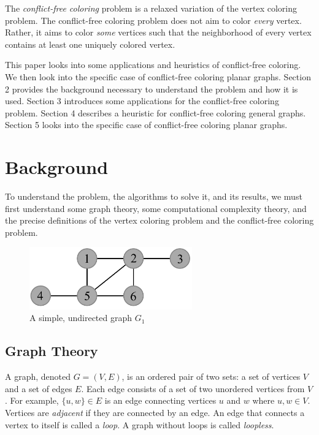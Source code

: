 \documentclass{sig-alternate}
\begin{document}
The \emph{conflict-free coloring} problem is a relaxed variation of the vertex coloring problem. The conflict-free coloring problem does not aim to color \emph{every} vertex. Rather, it aims to color \emph{some} vertices such that the neighborhood of every vertex contains at least one uniquely colored vertex.

This paper looks into some applications and heuristics of conflict-free coloring. We then look into the specific case of conflict-free coloring planar graphs. Section 2 provides the background necessary to understand the problem and how it is used. Section 3 introduces some applications for the conflict-free coloring problem. Section 4 describes a heuristic for conflict-free coloring general graphs. Section 5 looks into the specific case of conflict-free coloring planar graphs.


\section{Background}
\label{sec:background}
To understand the problem, the algorithms to solve it, and its results, we must first understand some graph theory, some computational complexity theory, and the precise definitions of the vertex coloring problem and the conflict-free coloring problem.

\begin{figure}[h]
	\centering
	\includegraphics[width=7cm]{../figures/example.pdf}
	\caption{A simple, undirected graph $G_1$}\label{fig:graph}
\end{figure}

\subsection{Graph Theory}
\label{sec:graphtheory}

A graph, denoted $G=(V,E)$, is an ordered pair of two sets: a set of vertices $V$ and a set of edges $E$. Each edge consists of a set of two unordered vertices from $V$. For example, $\{u, w\} \in E$ is an edge connecting vertices $u$ and $w$ where $u,w \in V$. Vertices are \emph{adjacent} if they are connected by an edge. An edge that connects a vertex to itself is called a \emph{loop}. A graph without loops is called \emph{loopless}.
\end{document}
